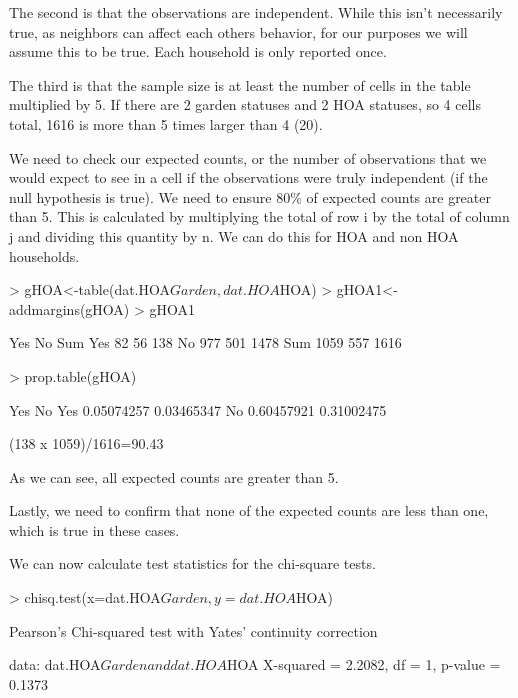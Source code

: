 \documentclass{article}
\begin{document}
The second is that the observations are independent. While this isn't necessarily true, as neighbors can affect each others behavior, for our purposes we will assume this to be true. Each household is only reported once. 

The third is that the sample size is at least the number of cells in the table multiplied by 5. If there are 2 garden statuses and 2 HOA statuses, so 4 cells total, 1616 is more than 5 times larger than 4 (20). 

We need to check our expected counts, or the number of observations that we would expect to see in a cell if the observations were truly independent (if the null hypothesis is true). We need to ensure 80\% of expected counts are greater than 5. This is calculated by multiplying the total of row i by the total of column j and dividing this quantity by n. We can do this for HOA and non HOA households. 

\begin{Schunk}
\begin{Sinput}
> gHOA<-table(dat.HOA$Garden,dat.HOA$HOA)
> gHOA1<-addmargins(gHOA)
> gHOA1
\end{Sinput}
\begin{Soutput}
       Yes   No  Sum
  Yes   82   56  138
  No   977  501 1478
  Sum 1059  557 1616
\end{Soutput}
\begin{Sinput}
> prop.table(gHOA)
\end{Sinput}
\begin{Soutput}
             Yes         No
  Yes 0.05074257 0.03465347
  No  0.60457921 0.31002475
\end{Soutput}
\end{Schunk}
(138 x 1059)/1616=90.43

As we can see, all expected counts are greater than 5.

Lastly, we need to confirm that none of the expected counts are less than one, which is true in these cases. 

We can now calculate test statistics for the chi-square tests. 
\begin{Schunk}
\begin{Sinput}
> chisq.test(x=dat.HOA$Garden,y=dat.HOA$HOA)
\end{Sinput}
\begin{Soutput}
	Pearson's Chi-squared test with Yates' continuity correction

data:  dat.HOA$Garden and dat.HOA$HOA
X-squared = 2.2082, df = 1, p-value = 0.1373
\end{Soutput}
\end{Schunk}
\end{document}
